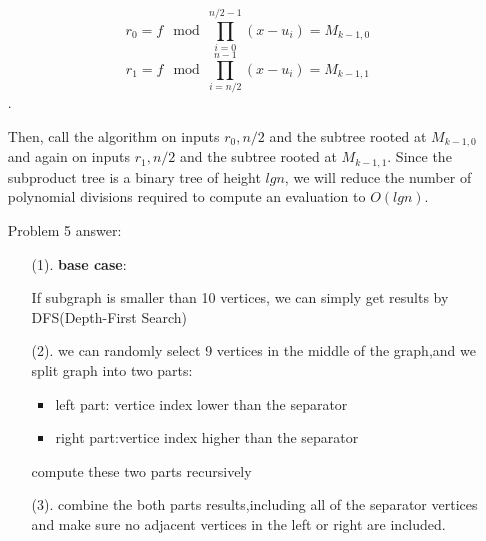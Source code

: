 \documentclass[12pt,letterpaper]{article}
\begin{document}
\begin{itemize}
            \[r_0=f\mod \prod_{i=0}^{n/2-1}(x-u_i)=M_{k-1,0}\]  
            \[r_1=f\mod\prod_{i=n/2}^{n-1}(x-u_i)=M_{k-1,1}\].
            
            Then, call the algorithm on inputs $r_0, n/2$ and the subtree rooted at $M_{k-1,0}$ and again on inputs $r_1, n/2$ and the subtree rooted at $M_{k-1,1}$. Since the subproduct tree is a binary tree of height $lgn$, we will reduce the number of polynomial divisions required to compute an evaluation to $O(lgn)$.
        \item[Problem 5]
            answer:\par
            \begin{itemize}
                \item [(1).]\textbf{base case}:\par If subgraph is smaller than 10 vertices, we can simply get results by DFS(Depth-First Search)  
                \item [(2).]we can randomly select 9 vertices in the middle of the graph,and we split graph into two parts:
                                \begin{itemize}
                                    \item left part: vertice index lower than the separator
                                    \item right part:vertice index higher than the separator
                                \end{itemize}
                            compute these two parts recursively
                \item [(3).]combine the both parts results,including all of the separator vertices and make sure no adjacent vertices in the left or right are included.
            \end{itemize}
    \end{itemize}
    

    
\end{document}
